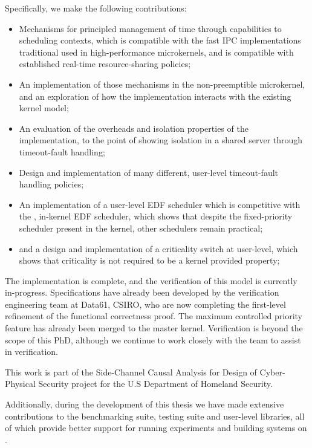 Specifically, we make the following contributions:

\begin{itemize}
    \item Mechanisms for principled management of time through capabilities to scheduling contexts,
        which is compatible with the fast IPC implementations traditional used in high-performance
        microkernels, and is compatible with established real-time resource-sharing policies;
    \item An implementation of those mechanisms in the non-preemptible \selfour microkernel, and an
        exploration of how the implementation interacts with the existing kernel model;
    \item An evaluation of the overheads and isolation properties of the implementation, to the
        point of showing isolation in a shared server through timeout-fault handling;
    \item Design and implementation of many different, user-level timeout-fault handling policies;
    \item An implementation of a user-level \gls{EDF} scheduler which is competitive with the
        \litmus, in-kernel EDF scheduler, which shows that despite the fixed-priority scheduler
        present in the kernel, other schedulers remain practical;
    \item and a design and implementation of a criticality switch at user-level, which shows that
        criticality is not required to be a kernel provided property;
\end{itemize}

The implementation is complete, and the verification of this model is currently in-progress.
Specifications have already been developed by the verification engineering team at Data61, CSIRO,
who are now completing the first-level refinement of the functional correctness proof.
The maximum controlled priority feature has already been merged to the master kernel. 
Verification is beyond the scope of this PhD, although we continue to work closely with
the team to assist in verification. 

This work is part of
the Side-Channel Causal Analysis for Design of Cyber-Physical Security project for the U.S
Department of Homeland Security.

Additionally, during the development of this thesis we have made extensive contributions to the 
\selfour benchmarking suite, testing suite and user-level libraries, all of which provide better 
support for running experiments and building systems on \selfour. 

